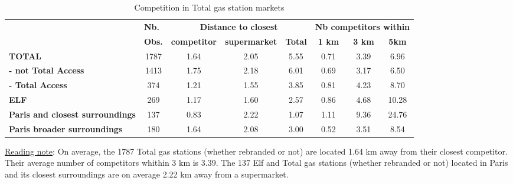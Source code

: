 \documentclass[english]{article}
\begin{document}
\begin{table}[H]
\caption{Competition in Total gas station markets}
\label{tab:competitiveness_total_markets_stats}
\begin{threeparttable}
\begin{footnotesize}
\begin{tabular}{lccccccc}
\hline
\hline
& \multicolumn{1}{l}{\textbf{Nb.}} & \multicolumn{3}{c}{\textbf{Distance to closest}} & \multicolumn{3}{c}{\textbf{Nb competitors within}}  \tabularnewline \cmidrule(l{2pt}r{2pt}){3-5} \cmidrule(l{2pt}r{2pt}){6-8}
& \multicolumn{1}{l}{\textbf{Obs.}} & \textbf{competitor}{ } & \textbf{supermarket}{ } & \textbf{Total}{ } & \textbf{1 km}{ } & \textbf{3 km}{ } & \textbf{ 5km }\tabularnewline
\hline
\textbf{TOTAL}{ } & {1787 } & {1.64 } & {2.05 } & {5.55 } & {0.71 } & {3.39 } & {6.96 }\tabularnewline
\textbf{- not Total Access}{ } & {1413 } & {1.75 } & {2.18 } & {6.01 } & {0.69 } & {3.17 } & {6.50 }\tabularnewline
\textbf{- Total Access}{ } & {374 } & {1.21 } & {1.55 } & {3.85 } & {0.81 } & {4.23 } & {8.70 }\tabularnewline
\hline
\textbf{ELF}{ } & {269 } & {1.17 } & {1.60 } & {2.57 } & {0.86 } & {4.68 } & {10.28 }\tabularnewline
\hline
\textbf{Paris and closest surroundings}{ } & {137 } & {0.83 } & {2.22 } & {1.07 } & {1.11 } & {9.36 } & {24.76}\tabularnewline
\textbf{Paris broader surroundings}{ } & {180 } & {1.64 } & {2.08 } & {3.00 } & {0.52 } & {3.51 } & {8.54}\tabularnewline
\hline
\hline
\end{tabular}
\end{footnotesize}
\end{threeparttable}
\end{table}


{\small{}\uline{Reading note}}{\small{}: }On average, the 1787 Total gas stations (whether rebranded or not) are located 1.64 km away from their closest competitor. Their average number of competitors whithin 3 km is 3.39. The 137 Elf and Total gas stations (whether rebranded or not) located in Paris and its closest surroundings are on average 2.22 km away from a supermarket.\medskip{}
\end{document}
